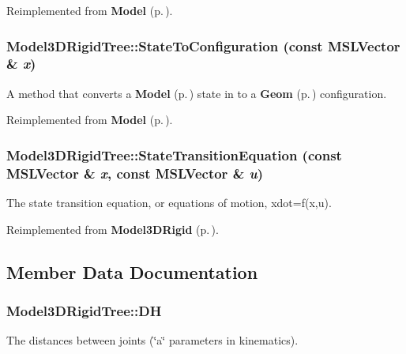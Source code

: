 Reimplemented from {\bf Model} {\rm (p.\,\pageref{classModel_a4})}.
\subsubsection{ Model3DRigid\-Tree::State\-To\-Configuration (const {\bf MSLVector} \& {\em x})\hspace{0.3cm}{\tt  [virtual]}}\label{classModel3DRigidTree_a3}


A method that converts a {\bf Model} {\rm (p.\,\pageref{classModel})} state in to a {\bf Geom} {\rm (p.\,\pageref{classGeom})} configuration.



Reimplemented from {\bf Model} {\rm (p.\,\pageref{classModel_a8})}.
\subsubsection{ Model3DRigid\-Tree::State\-Transition\-Equation (const {\bf MSLVector} \& {\em x}, const {\bf MSLVector} \& {\em u})\hspace{0.3cm}{\tt  [virtual]}}\label{classModel3DRigidTree_a2}


The state transition equation, or equations of motion, xdot=f(x,u).



Reimplemented from {\bf Model3DRigid} {\rm (p.\,\pageref{classModel3DRigid_a3})}.

\subsection{Member Data Documentation}
\subsubsection{ Model3DRigid\-Tree::DH}\label{classModel3DRigidTree_m1}


The distances between joints (\char`\"{}a\char`\"{} parameters in kinematics).

